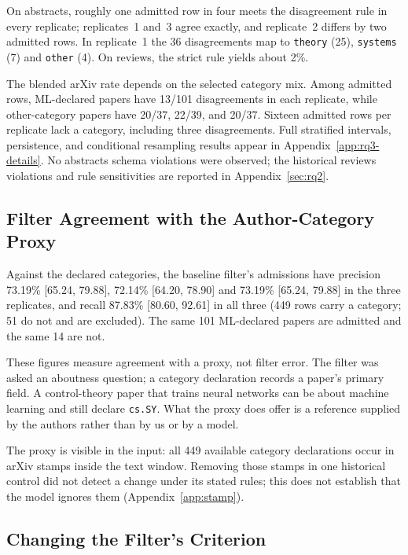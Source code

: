 \documentclass[11pt]{article}
\begin{document}
On abstracts, roughly one admitted row in four meets the disagreement rule
in every replicate; replicates~1 and~3 agree exactly, and replicate~2 differs
by two admitted rows. In replicate~1 the 36 disagreements map to
\texttt{theory} (25), \texttt{systems} (7) and \texttt{other} (4). On
reviews, the strict rule yields about 2\%.

The blended arXiv rate depends on the selected category mix. Among admitted
rows, ML-declared papers have 13/101 disagreements in each replicate, while
other-category papers have 20/37, 22/39, and 20/37. Sixteen admitted rows per
replicate lack a category, including three disagreements. Full stratified
intervals, persistence, and conditional resampling results appear in
Appendix~\ref{app:rq3-details}. No abstracts schema violations were observed;
the historical reviews violations and rule sensitivities are reported in
Appendix~\ref{sec:rq2}.

\subsection{Filter Agreement with the Author-Category Proxy}

Against the declared categories, the baseline filter's admissions have
precision 73.19\% [65.24, 79.88], 72.14\% [64.20, 78.90] and 73.19\%
[65.24, 79.88] in the three replicates, and recall 87.83\% [80.60, 92.61] in
all three (449 rows carry a category; 51 do not and are excluded). The same
101 ML-declared papers are admitted and the same 14 are not.

These figures measure agreement with a proxy, not filter error. The filter
was asked an aboutness question; a category declaration records a paper's
primary field. A control-theory paper that trains neural networks can be
about machine learning and still declare \texttt{cs.SY}. What the proxy does
offer is a reference supplied by the authors rather than by us or by a
model.

The proxy is visible in the input: all 449 available category declarations
occur in arXiv stamps inside the text window. Removing those stamps in one
historical control did not detect a change under its stated rules; this does
not establish that the model ignores them (Appendix~\ref{app:stamp}).

\subsection{Changing the Filter's Criterion}
\label{sec:f12}
\end{document}
